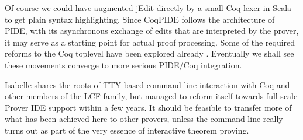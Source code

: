 \begin{isabellebody}
\begin{isamarkuptext}
  \smallskip Of course we could have augmented jEdit directly by a
  small Coq lexer in Scala to get plain syntax highlighting.  Since
  CoqPIDE follows the architecture of PIDE, with its asynchronous
  exchange of edits that are interpreted by the prover, it may serve
  as a starting point for actual proof processing.  Some of the
  required reforms to the Coq toplevel have been explored already
  \cite{Tassi-Barras:2012}.  Eventually we shall see these movements
  converge to more serious PIDE/Coq integration.

  Isabelle shares the roots of TTY-based command-line interaction with
  Coq and other members of the LCF family, but managed to reform
  itself towards full-scale Prover IDE support within a few years.  It
  should be feasible to transfer more of what has been achieved here
  to other provers, unless the command-line really turns out as part
  of the very essence of interactive theorem proving.\end{isamarkuptext}\isamarkuptrue \isadelimtheory
\endisadelimtheory
\isatagtheory
{}\isamarkupfalse \endisatagtheory
{\isafoldtheory}\isadelimtheory
\endisadelimtheory
\isanewline
\end{isabellebody}